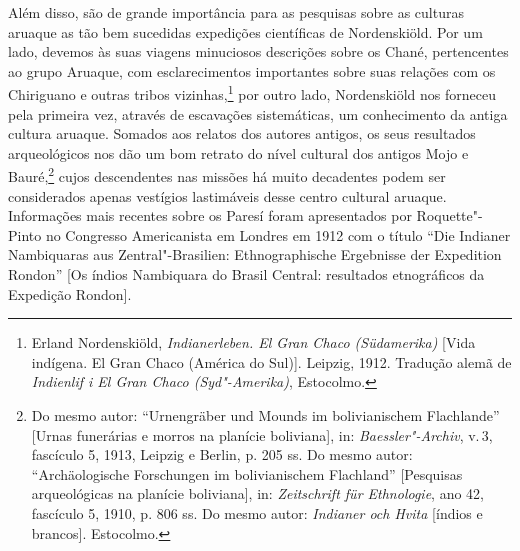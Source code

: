 Além disso, são de grande importância para as pesquisas sobre as
culturas aruaque as tão bem sucedidas expedições científicas de
Nordenskiöld. Por um lado, devemos às suas viagens minuciosos
descrições sobre os Chané, pertencentes ao grupo Aruaque, com
esclarecimentos importantes sobre suas relações com os Chiriguano e
outras tribos vizinhas,\footnote{Erland Nordenskiöld,
  \emph{Indianerleben. El Gran Chaco (Südamerika)} {[}Vida indígena. El
  Gran Chaco (América do Sul){]}. Leipzig, 1912. Tradução alemã de
  \emph{Indienlif i El Gran Chaco (Syd"-Amerika)}, Estocolmo.} por outro
lado, Nordenskiöld nos forneceu pela primeira vez, através de escavações
sistemáticas, um conhecimento da antiga cultura aruaque. Somados aos
relatos dos autores antigos, os seus resultados arqueológicos nos dão um
bom retrato do nível cultural dos antigos Mojo e Bauré,\footnote{Do mesmo
  autor: ``Urnengräber und Mounds im bolivianischem Flachlande''
  {[}Urnas funerárias e morros na planície boliviana{]}, in:
  \emph{Baessler"-Archiv}, v.\,3, fascículo 5, 1913, Leipzig e Berlin, p.
  205 ss. Do mesmo autor: ``Archäologische Forschungen im bolivianischem
  Flachland'' {[}Pesquisas arqueológicas na planície boliviana{]}, in:
  \emph{Zeitschrift für Ethnologie}, ano 42, fascículo 5, 1910, p. 806
  ss. Do mesmo autor: \emph{Indianer och Hvita} {[}índios e brancos{]}.
  Estocolmo.} cujos descendentes nas missões há muito decadentes podem
ser considerados apenas vestígios lastimáveis desse centro cultural
aruaque. Informações mais recentes sobre os Paresí foram apresentados
por Roquette"-Pinto no Congresso Americanista em Londres em 1912 com o
título ``Die Indianer Nambiquaras aus Zentral"-Brasilien:
Ethnographische Ergebnisse der Expedition Rondon'' {[}Os índios
Nambiquara do Brasil Central: resultados etnográficos da Expedição
Rondon{]}.

